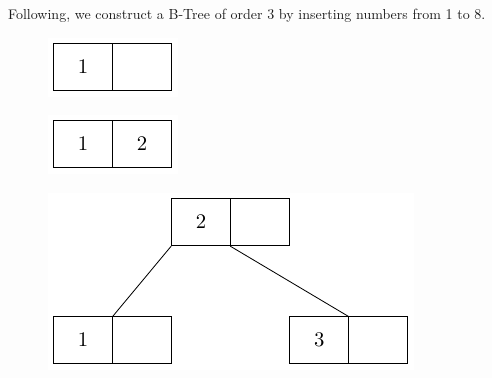 Following, we construct a B-Tree of order 3 by inserting numbers from 1 to 8.

\begin{center}
\begin{minipage}{0.1\textwidth}
\begin{figure}[H]
  \centering
  \includegraphics[width=\textwidth]{Figure/BT_D1.pdf}
\end{figure}
\end{minipage}\quad
\begin{minipage}{0.1\textwidth}
\begin{figure}[H]
  \centering
  \includegraphics[width=\textwidth]{Figure/BT_D2.pdf}
\end{figure}
\end{minipage}\quad
\begin{minipage}{0.3\textwidth}
\begin{figure}[H]
  \centering
  \includegraphics[width=\textwidth]{Figure/BT_D3.pdf}

\end{figure}
\end{minipage}
\end{center}

